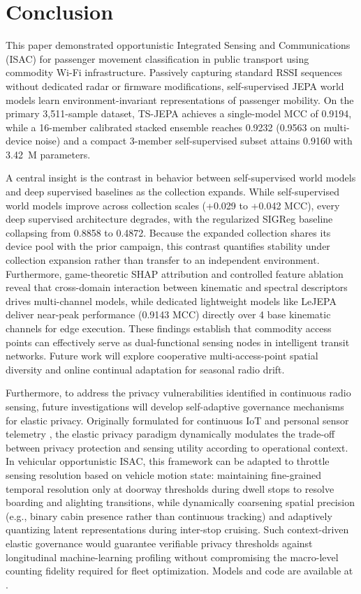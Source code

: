 \section{Conclusion}

This paper demonstrated opportunistic Integrated Sensing and Communications (ISAC) for passenger movement classification in public transport using commodity Wi-Fi infrastructure. Passively capturing standard \ac{RSSI} sequences without dedicated radar or firmware modifications, self-supervised \ac{JEPA} world models learn environment-invariant representations of passenger mobility. On the primary 3,511-sample dataset, \ac{TS-JEPA} achieves a single-model \ac{MCC} of 0.9194, while a 16-member calibrated stacked ensemble reaches 0.9232 (0.9563 on multi-device noise) and a compact 3-member self-supervised subset attains 0.9160 with 3.42~M parameters.

A central insight is the contrast in behavior between self-supervised world models and deep supervised baselines as the collection expands. While self-supervised world models improve across collection scales (+0.029 to +0.042 \ac{MCC}), every deep supervised architecture degrades, with the regularized SIGReg baseline collapsing from 0.8858 to 0.4872. Because the expanded collection shares its device pool with the prior campaign, this contrast quantifies stability under collection expansion rather than transfer to an independent environment. Furthermore, game-theoretic \ac{SHAP} attribution and controlled feature ablation reveal that cross-domain interaction between kinematic and spectral descriptors drives multi-channel models, while dedicated lightweight models like LeJEPA deliver near-peak performance (0.9143 \ac{MCC}) directly over 4 base kinematic channels for edge execution. These findings establish that commodity access points can effectively serve as dual-functional sensing nodes in intelligent transit networks. Future work will explore cooperative multi-access-point spatial diversity and online continual adaptation for seasonal radio drift.

Furthermore, to address the privacy vulnerabilities identified in continuous radio sensing, future investigations will develop self-adaptive governance mechanisms for elastic privacy. Originally formulated for continuous IoT and personal sensor telemetry \cite{silva2026elastic}, the elastic privacy paradigm dynamically modulates the trade-off between privacy protection and sensing utility according to operational context. In vehicular opportunistic ISAC, this framework can be adapted to throttle sensing resolution based on vehicle motion state: maintaining fine-grained temporal resolution only at doorway thresholds during dwell stops to resolve boarding and alighting transitions, while dynamically coarsening spatial precision (e.g., binary cabin presence rather than continuous tracking) and adaptively quantizing latent representations during inter-stop cruising. Such context-driven elastic governance would guarantee verifiable privacy thresholds against longitudinal machine-learning profiling without compromising the macro-level counting fidelity required for fleet optimization. Models and code are available at \cite{githubrepo}.
